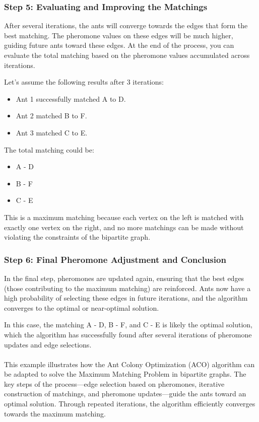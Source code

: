 
\subsubsection*{Step 5: Evaluating and Improving the Matchings}
After several iterations, the ants will converge towards the edges that form the best matching. The pheromone values on these edges will be much higher, guiding future ants toward these edges. At the end of the process, you can evaluate the total matching based on the pheromone values accumulated across iterations.

Let’s assume the following results after 3 iterations:

\begin{itemize}
  \item Ant 1 successfully matched A to D.
  \item Ant 2 matched B to F.
  \item Ant 3 matched C to E.
\end{itemize}

The total matching could be:

\begin{itemize}
  \item A - D
  \item B - F
  \item C - E
\end{itemize}

This is a maximum matching because each vertex on the left is matched with exactly one vertex on the right, and no more matchings can be made without violating the constraints of the bipartite graph.

\subsubsection*{Step 6: Final Pheromone Adjustment and Conclusion}
In the final step, pheromones are updated again, ensuring that the best edges (those contributing to the maximum matching) are reinforced. Ants now have a high probability of selecting these edges in future iterations, and the algorithm converges to the optimal or near-optimal solution.

In this case, the matching A - D, B - F, and C - E is likely the optimal solution, which the algorithm has successfully found after several iterations of pheromone updates and edge selections.

\paragraph{}This example illustrates how the Ant Colony Optimization (ACO) algorithm can be adapted to solve the Maximum Matching Problem in bipartite graphs. The key steps of the process—edge selection based on pheromones, iterative construction of matchings, and pheromone updates—guide the ants toward an optimal solution. Through repeated iterations, the algorithm efficiently converges towards the maximum matching.




